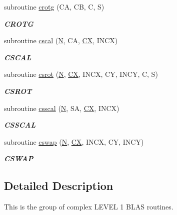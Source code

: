 \begin{DoxyCompactItemize}
subroutine \hyperlink{group__complex__blas__level1_ga27b909f1b845f8dc1d34d28941e4f9e3}{crotg} (C\+A, C\+B, C, S)
\begin{DoxyCompactList}\small\item\em {\bfseries C\+R\+O\+T\+G} \end{DoxyCompactList}\item 
subroutine \hyperlink{group__complex__blas__level1_gab2d569bbfe6356599c69c057ecc2b3f7}{cscal} (\hyperlink{polmisc_8c_a0240ac851181b84ac374872dc5434ee4}{N}, C\+A, \hyperlink{scsum1_8c_a5a76da95c549c41790389a76e12fdcb5}{C\+X}, I\+N\+C\+X)
\begin{DoxyCompactList}\small\item\em {\bfseries C\+S\+C\+A\+L} \end{DoxyCompactList}\item 
subroutine \hyperlink{group__complex__blas__level1_gaf660f9cda67820f314f36c9668272987}{csrot} (\hyperlink{polmisc_8c_a0240ac851181b84ac374872dc5434ee4}{N}, \hyperlink{scsum1_8c_a5a76da95c549c41790389a76e12fdcb5}{C\+X}, I\+N\+C\+X, C\+Y, I\+N\+C\+Y, C, S)
\begin{DoxyCompactList}\small\item\em {\bfseries C\+S\+R\+O\+T} \end{DoxyCompactList}\item 
subroutine \hyperlink{group__complex__blas__level1_ga7ac1991bb0c9da7b63fd64c999d6b859}{csscal} (\hyperlink{polmisc_8c_a0240ac851181b84ac374872dc5434ee4}{N}, S\+A, \hyperlink{scsum1_8c_a5a76da95c549c41790389a76e12fdcb5}{C\+X}, I\+N\+C\+X)
\begin{DoxyCompactList}\small\item\em {\bfseries C\+S\+S\+C\+A\+L} \end{DoxyCompactList}\item 
subroutine \hyperlink{group__complex__blas__level1_gaa50b533bbd2eceac1f59dbc780d7a182}{cswap} (\hyperlink{polmisc_8c_a0240ac851181b84ac374872dc5434ee4}{N}, \hyperlink{scsum1_8c_a5a76da95c549c41790389a76e12fdcb5}{C\+X}, I\+N\+C\+X, C\+Y, I\+N\+C\+Y)
\begin{DoxyCompactList}\small\item\em {\bfseries C\+S\+W\+A\+P} \end{DoxyCompactList}\end{DoxyCompactItemize}


\subsection{Detailed Description}
This is the group of complex L\+E\+V\+E\+L 1 B\+L\+A\+S routines. 

